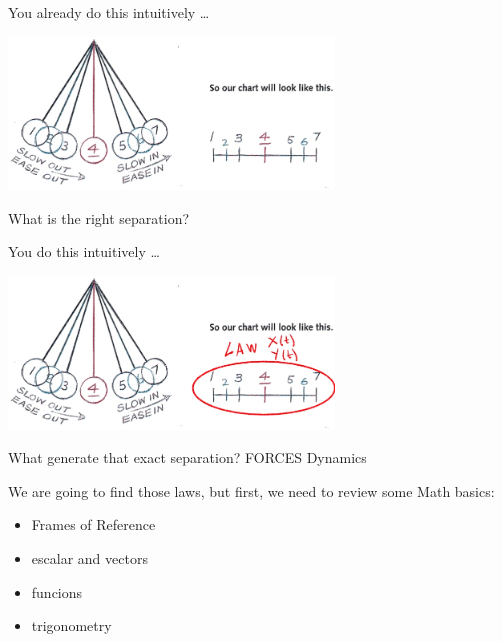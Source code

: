 \documentclass[]{beamer}
\begin{document}
  \begin{frame}
   
You already do this intuitively \dots \pause

\begin{center}
   \includegraphics[height=1.6in]{images/space_timing.jpg}
 \end{center}
   

 \pause

 What is the right separation?
 \end{frame}

  

   \begin{frame}
   
      You do this intuitively \dots \pause
      
      \begin{center}
         \includegraphics[height=1.6in]{images/space_timing2.jpg}
       \end{center}
         
      
       \pause
      
       What generate that exact separation? \pause \textcolor{mypink1}{FORCES \pause Dynamics}
       \end{frame}
       
 

       
 

  \begin{frame}
   We are going to find those laws, but first, we need to review some Math basics: 
  
  \pause
  \vspace{3mm}
  
  \begin{itemize}
  \item Frames of Reference 
  \item escalar and vectors
  \item funcions
  \item trigonometry
  \end{itemize}
  
  
  
  
  
   \end{frame}
\end{document}
